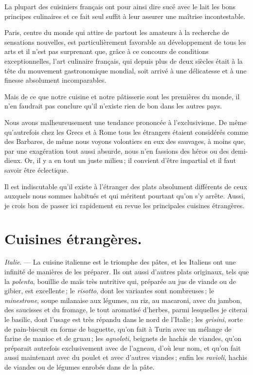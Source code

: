 La plupart des cuisiniers français ont pour ainsi dire sucé avec le lait les
bons principes culinaires et ce fait seul suffit à leur assurer une maîtrise
incontestable.

Paris, centre du monde qui attire de partout les amateurs à la recherche de
sensations nouvelles, est particulièrement favorable au développement de tous
les arts et il n'est pas surprenant que, grâce à ce concours de conditions
exceptionnelles, l'art culinaire français, qui depuis plus de deux siècles
était à la tête du mouvement gastronomique mondial, soit arrivé à une
délicatesse et à une finesse absolument incomparables.

\sk

Mais de ce que notre cuisine et notre pâtisserie sont les premières du monde,
il n'en faudrait pas conclure qu'il n'existe rien de bon dans les autres pays.

Nous avons malheureusement une tendance prononcée à l'exclusivisme. De même
qu'autrefois chez les Grecs et à Rome tous les étrangers étaient considérés
comme des Barbares, de même nous voyons volontiers en eux des sauvages, à moins
que, par une exagération tout aussi absurde, nous n'en fassions des héros ou
des demi-dieux. Or, il y a en tout un juste milieu ; il convient d'être
impartial et il faut savoir être éclectique.

Il est indiscutable qu'il existe à l'étranger des plats absolument différents
de ceux auxquels nous sommes habitués et qui méritent pourtant qu'on s'y
arrête. Aussi, je crois bon de passer ici rapidement en revue les principales
cuisines étrangères.


\section*{\centering Cuisines étrangères.}

\textit{Italie}. — La cuisine italienne est le triomphe des pâtes, et les
Italiens ont une infinité de manières de les préparer. Ils ont aussi d’autres
plats originaux, tels que la \textit{polenta}, bouillie de maïs très nutritive
qui, préparée au jus de viande ou de gibier, est excellente ; le
\textit{risotto}, dont les variantes sont nombreuses ; le \textit{minestrone},
soupe milanaise aux légumes, au riz, au macaroni, avec du jambon, des saucisses
et du fromage, le tout aromatisé d'herbes, parmi lesquelles je citerai le
basilic, dont l'usage est très répandu dans le nord de l'Italie ; les
\textit{grisini}, sorte de pain-biscuit en forme de baguette, qu'on fait
à Turin avec un mélange de farine de manioc et de gruau ; les
\textit{agnoloti}, beignets de hachis de viandes, qu'on préparait autrefois
exclusivement avec de l'agneau, d'où leur nom, et qu'on fait aussi maintenant
avec du poulet et avec d'autres viandes ; enfin les \textit{ravioli}, hachis de
viandes ou de légumes enrobés dans de la pâte.

